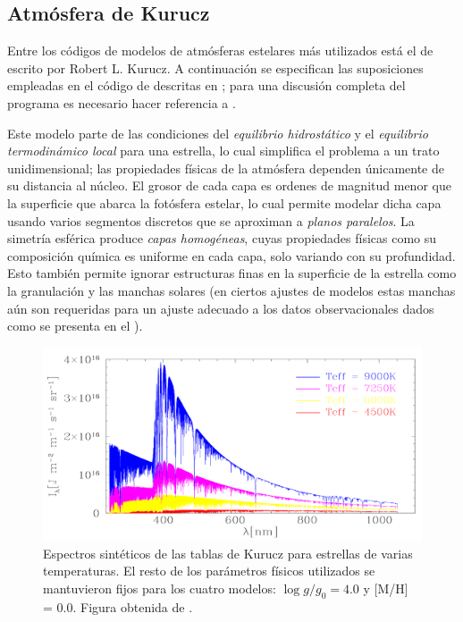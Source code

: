 \subsection{Atmósfera de Kurucz}

Entre los códigos de modelos de atmósferas estelares más utilizados está el de
 escrito por Robert L. Kurucz. A continuación se especifican las
suposiciones empleadas en el código de  descritas en
; para una discusión completa
del programa es necesario hacer referencia a .

Este modelo parte de las condiciones del \textit{equilibrio hidrostático} y el
\textit{equilibrio termodinámico local} para una estrella, lo cual simplifica el
problema a un trato unidimensional; las propiedades físicas de la atmósfera
dependen únicamente de su distancia al núcleo. El grosor de cada capa es ordenes
de magnitud menor que la superficie que abarca la fotósfera estelar, lo cual
permite modelar dicha capa usando varios segmentos discretos que se aproximan a
\textit{planos paralelos}. La simetría esférica produce \textit{capas
homogéneas}, cuyas propiedades físicas como su composición química es uniforme
en cada capa, solo variando con su profundidad. Esto también permite ignorar
estructuras finas en la superficie de la estrella como la granulación y las
manchas solares (en ciertos ajustes de modelos estas manchas aún son requeridas
para un ajuste adecuado a los datos observacionales dados como se presenta en el
). 

\begin{figure}[!ht]
	\centering
	\includegraphics[scale=0.29]{Introduccion/Figures/Figura Kurucz_PHOEBE Reference.png}
	\caption{Espectros sintéticos de las tablas de Kurucz para estrellas de
	varias temperaturas. El resto de los parámetros físicos utilizados se
	mantuvieron fijos para los cuatro modelos: $\log{g/g_0} = 4.0$ y [M/H] =
	0.0. Figura obtenida de .}
	\label{figuraKuruczEspectro}
\end{figure}

